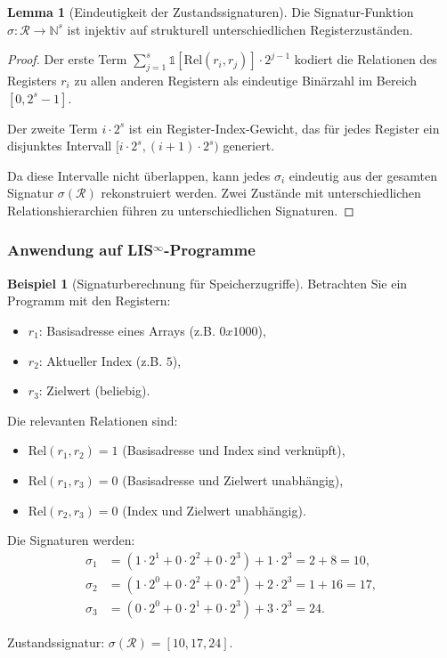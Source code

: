 \documentclass[a4paper,12pt]{article}
\theoremstyle{definition}
\newtheorem{beispiel}{Beispiel}
\newtheorem{lemma}{Lemma}
\begin{document}
\begin{lemma}[Eindeutigkeit der Zustandssignaturen]
	\label{lem:signature_uniqueness}
	Die Signatur-Funktion $\sigma: \mathcal{R} \to \mathbb{N}^s$ ist injektiv auf strukturell unterschiedlichen Registerzuständen.
\end{lemma}

\begin{proof}
	Der erste Term $\sum_{j=1}^{s} \mathbb{1}[\text{Rel}(r_i, r_j)] \cdot 2^{j-1}$ kodiert die Relationen des Registers $r_i$ zu allen anderen Registern als eindeutige Binärzahl im Bereich $[0, 2^s - 1]$.
	
	Der zweite Term $i \cdot 2^s$ ist ein Register-Index-Gewicht, das für jedes Register ein disjunktes Intervall $[i \cdot 2^s, (i+1) \cdot 2^s)$ generiert.
	
	Da diese Intervalle nicht überlappen, kann jedes $\sigma_i$ eindeutig aus der gesamten Signatur $\sigma(\mathcal{R})$ rekonstruiert werden. Zwei Zustände mit unterschiedlichen Relationshierarchien führen zu unterschiedlichen Signaturen.
\end{proof}

\subsubsection{Anwendung auf LIS$^{\infty}$-Programme}

\begin{beispiel}[Signaturberechnung für Speicherzugriffe]
	\label{bsp:signature_memory}
	Betrachten Sie ein Programm mit den Registern:
	\begin{itemize}
		\item[-] $r_1$: Basisadresse eines Arrays (z.B. $0x1000$),
		\item[-] $r_2$: Aktueller Index (z.B. $5$),
		\item[-] $r_3$: Zielwert (beliebig).
	\end{itemize}
	
	Die relevanten Relationen sind:
	\begin{itemize}
		\item $\text{Rel}(r_1, r_2) = 1$ (Basisadresse und Index sind verknüpft),
		\item $\text{Rel}(r_1, r_3) = 0$ (Basisadresse und Zielwert unabhängig),
		\item $\text{Rel}(r_2, r_3) = 0$ (Index und Zielwert unabhängig).
	\end{itemize}
	
	Die Signaturen werden:
	\begin{align*}
	\sigma_1 &= (1 \cdot 2^1 + 0 \cdot 2^2 + 0 \cdot 2^3) + 1 \cdot 2^3 = 2 + 8 = 10, \\
	\sigma_2 &= (1 \cdot 2^0 + 0 \cdot 2^2 + 0 \cdot 2^3) + 2 \cdot 2^3 = 1 + 16 = 17, \\
	\sigma_3 &= (0 \cdot 2^0 + 0 \cdot 2^1 + 0 \cdot 2^3) + 3 \cdot 2^3 = 24.
	\end{align*}
	
	Zustandssignatur: $\sigma(\mathcal{R}) = [10, 17, 24]$.
\end{beispiel}
\end{document}
